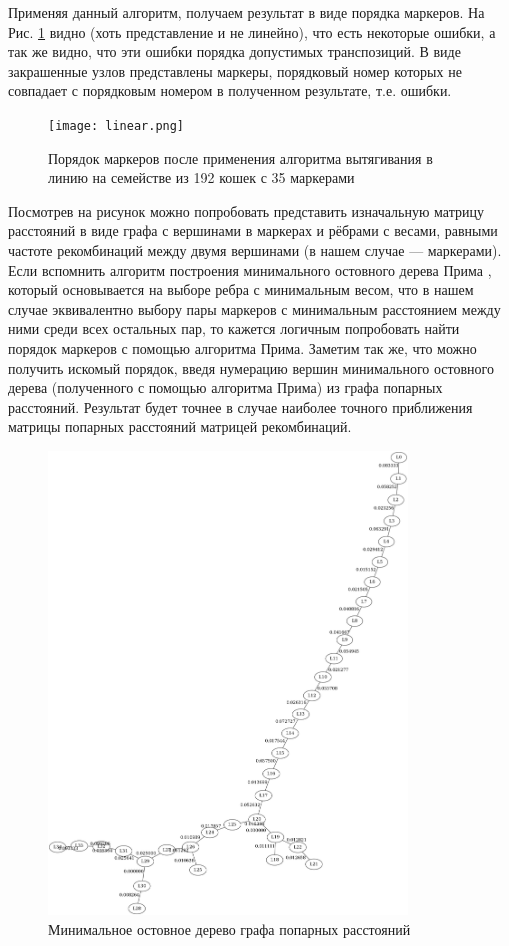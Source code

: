 \documentclass{matmex-diploma-custom}
\begin{document}
Применяя данный алгоритм, получаем результат в виде порядка маркеров.
На Рис. \ref{fig:fig3} видно (хоть представление и не линейно), что
есть некоторые ошибки, а так же видно, что эти ошибки порядка
допустимых транспозиций. В виде закрашенные узлов представлены
маркеры, порядковый номер которых не совпадает с порядковым номером в
полученном результате, т.е. ошибки.
\begin{figure}[h]
 \centering
  \texttt{[image: linear.png]}
  \caption[width=0.4\textwidth]{Порядок маркеров после применения
    алгоритма вытягивания в линию на семействе из 192 кошек с 35 маркерами}
  \label{fig:fig3}
\end{figure}
Посмотрев на рисунок можно попробовать представить изначальную матрицу
расстояний в виде графа с вершинами в маркерах и рёбрами с весами,
равными частоте рекомбинаций между двумя вершинами (в нашем случае ---
маркерами). Если вспомнить алгоритм построения минимального остовного
дерева Прима \cite{cormen2001introduction}, который основывается на
выборе ребра с минимальным весом, что в нашем случае эквивалентно
выбору пары маркеров с минимальным расстоянием между ними среди всех
остальных пар, то кажется логичным попробовать найти порядок маркеров
с помощью алгоритма Прима. Заметим так же, что можно получить искомый
порядок, введя нумерацию вершин минимального остовного дерева
(полученного с помощью алгоритма Прима) из графа попарных
расстояний. Результат будет точнее в случае наиболее точного
приближения матрицы попарных расстояний матрицей рекомбинаций.
\begin{figure}[h]
  \centering
  \includegraphics[width=0.85\textwidth]{prm.png}
  \caption[width=0.4\textwidth]{Минимальное остовное дерево графа
    попарных расстояний}
  \label{fig:fig4}
\end{figure}
\end{document}
